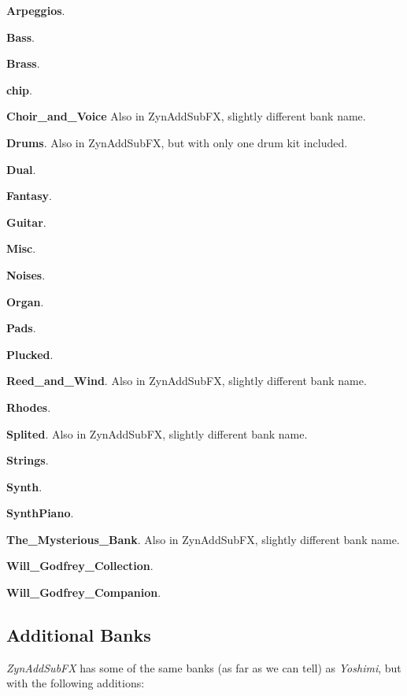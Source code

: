    \begin{enumber}
      \item \textbf{Arpeggios}.
      \item \textbf{Bass}.
      \item \textbf{Brass}.
      \item \textbf{chip}.
      \item \textbf{Choir\_and\_Voice}
         Also in ZynAddSubFX, slightly different bank name.
      \item \textbf{Drums}.
         Also in ZynAddSubFX, but with only one drum kit included.
      \item \textbf{Dual}.
      \item \textbf{Fantasy}.
      \item \textbf{Guitar}.
      \item \textbf{Misc}.
      \item \textbf{Noises}.
      \item \textbf{Organ}.
      \item \textbf{Pads}.
      \item \textbf{Plucked}.
      \item \textbf{Reed\_and\_Wind}.
         Also in ZynAddSubFX, slightly different bank name.
      \item \textbf{Rhodes}.
      \item \textbf{Splited}.
         Also in ZynAddSubFX, slightly different bank name.
      \item \textbf{Strings}.
      \item \textbf{Synth}.
      \item \textbf{SynthPiano}.
      \item \textbf{The\_Mysterious\_Bank}.
         Also in ZynAddSubFX, slightly different bank name.
      \item \textbf{Will\_Godfrey\_Collection}.
      \item \textbf{Will\_Godfrey\_Companion}.
   \end{enumber}

\subsection{Additional Banks}
\label{subsec:banks_collection_additional}

   \textsl{ZynAddSubFX} has some of the same
   banks (as far as we can tell) as \textsl{Yoshimi}, but with the following
   additions:

